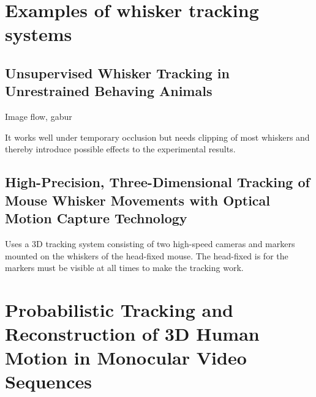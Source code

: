 
\section{Examples of whisker tracking systems}
    \subsection{Unsupervised Whisker Tracking in Unrestrained Behaving Animals\cite{UnsupervisedTracking}}

        Image flow, gabur

        It works well under temporary occlusion but needs clipping of most whiskers and thereby introduce possible effects to the experimental results.



    \subsection{High-Precision, Three-Dimensional Tracking of Mouse Whisker Movements with Optical Motion Capture Technology\cite{BadExample1}}
        


        Uses a 3D tracking system consisting of two high-speed cameras and markers mounted on the whiskers of the head-fixed mouse.
        The head-fixed is for the markers must be visible at all times to make the tracking work.
        

\section{Probabilistic Tracking and Reconstruction of 3D Human Motion in Monocular Video Sequences\cite{Hedvig}}
    


